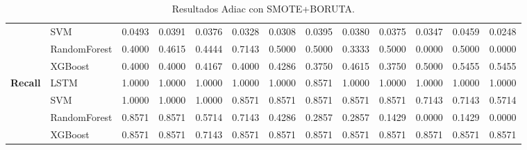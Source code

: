 \begin{table}[h]
\begin{adjustbox}{max width=15cm}
\begin{tabular}{|c|l|r|r|r|r|r|r|r|r|r|r|r|}
			& SVM &  0.0493 &  0.0391 &  0.0376 &  0.0328 &  0.0308 &  0.0395 &  0.0380 &  0.0375 &  0.0347 &  0.0459 &  0.0248 \\
			& RandomForest &  0.4000 &  0.4615 &  0.4444 &  0.7143 &  0.5000 &  0.5000 &  0.3333 &  0.5000 &  0.0000 &  0.5000 &  0.0000 \\
			& XGBoost &  0.4000 &  0.4000 &  0.4167 &  0.4000 &  0.4286 &  0.3750 &  0.4615 &  0.3750 &  0.5000 &  0.5455 &  0.5455 \\
			\hline
			\textbf{Recall} & LSTM &  1.0000 &  1.0000 &  1.0000 &  1.0000 &  1.0000 &  0.8571 &  1.0000 &  1.0000 &  1.0000 &  1.0000 &  1.0000 \\
			& SVM &  1.0000 &  1.0000 &  1.0000 &  0.8571 &  0.8571 &  0.8571 &  0.8571 &  0.8571 &  0.7143 &  0.7143 &  0.5714 \\
			& RandomForest &  0.8571 &  0.8571 &  0.5714 &  0.7143 &  0.4286 &  0.2857 &  0.2857 &  0.1429 &  0.0000 &  0.1429 &  0.0000 \\
			& XGBoost &  0.8571 &  0.8571 &  0.7143 &  0.8571 &  0.8571 &  0.8571 &  0.8571 &  0.8571 &  0.8571 &  0.8571 &  0.8571 \\
			\hline
		\end{tabular}
	\end{adjustbox}
	\caption{Resultados Adiac con SMOTE+BORUTA.}
	\label{tab:Adiac_SMOTE_BORUTA}
\end{table}
\newpage
